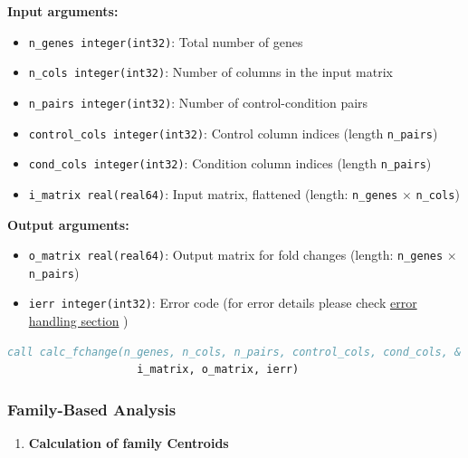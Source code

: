 \documentclass[11pt]{article}
\begin{document}
\begin{enumerate}
	      \textbf{Input arguments:}
	      \begin{itemize}
	      	\item \texttt{n\_genes integer(int32)}: Total number of genes
	      	      
	      	\item \texttt{n\_cols integer(int32)}: Number of columns in the input matrix
	      	      
	      	\item \texttt{n\_pairs integer(int32)}: Number of control-condition pairs
	      	      
	      	\item \texttt{control\_cols integer(int32)}: Control column indices (length
	      	      \texttt{n\_pairs})
	      	      
	      	\item \texttt{cond\_cols integer(int32)}: Condition column indices (length
	      	      \texttt{n\_pairs})
	      	      
	      	\item \texttt{i\_matrix real(real64)}: Input matrix, flattened (length:
	      	      \texttt{n\_genes} $\times$ \texttt{n\_cols})
	      \end{itemize}
	      
	      \textbf{Output arguments:}
	      \begin{itemize}
	      	\item \texttt{o\_matrix real(real64)}: Output matrix for fold changes (length:
	      	      \texttt{n\_genes} $\times$ \texttt{n\_pairs})
	      	      
	      	\item \texttt{ierr integer(int32)}: Error code (for error details please
	      	      check \hyperref[sec:error-handling]{error handling section} )
	      \end{itemize}
	      
	      \begin{lstlisting}[language=Fortran, caption={Fold Change Calculation}]
call calc_fchange(n_genes, n_cols, n_pairs, control_cols, cond_cols, &
                    i_matrix, o_matrix, ierr)
	      \end{lstlisting}
	      
	      \subsubsection{Family-Based Analysis}
	      \begin{enumerate}
	      	\item \textbf{Calculation of family Centroids}
	      	      

\end{enumerate}
\end{enumerate}
\end{document}
